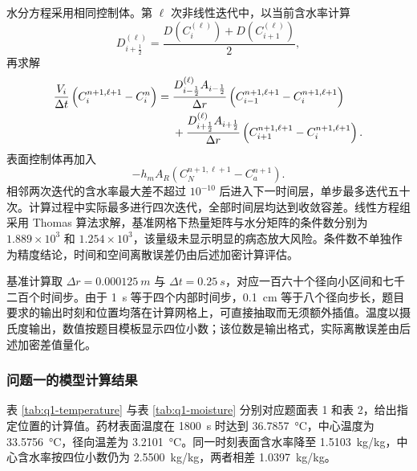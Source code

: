 \documentclass[withoutpreface,bwprint]{cumcmthesis}
\begin{document}
水分方程采用相同控制体。第 \(\ell\) 次非线性迭代中，以当前含水率计算
\begin{equation}
D_{i+\frac12}^{(\ell)}
=
\frac{
D\left(C_i^{(\ell)}\right)
+D\left(C_{i+1}^{(\ell)}\right)
}{2},
\label{eq:interface-diffusivity}
\end{equation}
再求解
\begin{align}
\frac{V_i}{\Delta t}
\left(C_i^{n+1,\ell+1}-C_i^n\right)
={}&
\frac{D_{i-\frac12}^{(\ell)}A_{i-\frac12}}{\Delta r}
\left(C_{i-1}^{n+1,\ell+1}-C_i^{n+1,\ell+1}\right)\notag\\
&+
\frac{D_{i+\frac12}^{(\ell)}A_{i+\frac12}}{\Delta r}
\left(C_{i+1}^{n+1,\ell+1}-C_i^{n+1,\ell+1}\right).
\label{eq:moisture-fvm}
\end{align}
表面控制体再加入
\begin{equation}
-h_mA_R\left(C_N^{n+1,\ell+1}-C_a^{n+1}\right).
\label{eq:surface-moisture-flux}
\end{equation}
相邻两次迭代的含水率最大差不超过 \(10^{-10}\) 后进入下一时间层，单步最多迭代五十次。计算过程中实际最多进行四次迭代，全部时间层均达到收敛容差。线性方程组采用 Thomas 算法求解，基准网格下热量矩阵与水分矩阵的条件数分别为 \(1.889\times10^3\) 和 \(1.254\times10^3\)，该量级未显示明显的病态放大风险。条件数不单独作为精度结论，时间和空间离散误差仍由后述加密计算评估。

基准计算取 \(\Delta r=\SI{0.000125}{m}\) 与 \(\Delta t=\SI{0.25}{s}\)，对应一百六十个径向小区间和七千二百个时间步。由于 \SI{1}{s} 等于四个内部时间步，\SI{0.1}{cm} 等于八个径向步长，题目要求的输出时刻和位置均落在计算网格上，可直接抽取而无须额外插值。温度以摄氏度输出，数值按题目模板显示四位小数；该位数是输出格式，实际离散误差由后述加密差值量化。


\subsubsection{问题一的模型计算结果}

表 \ref{tab:q1-temperature} 与表 \ref{tab:q1-moisture} 分别对应题面表 1 和表 2，给出指定位置的计算值。药材表面温度在 \SI{1800}{s} 时达到 \SI{36.7857}{\degreeCelsius}，中心温度为 \SI{33.5756}{\degreeCelsius}，径向温差为 \SI{3.2101}{\degreeCelsius}。同一时刻表面含水率降至 \SI{1.5103}{kg/kg}，中心含水率按四位小数仍为 \SI{2.5500}{kg/kg}，两者相差 \SI{1.0397}{kg/kg}。
\end{document}
